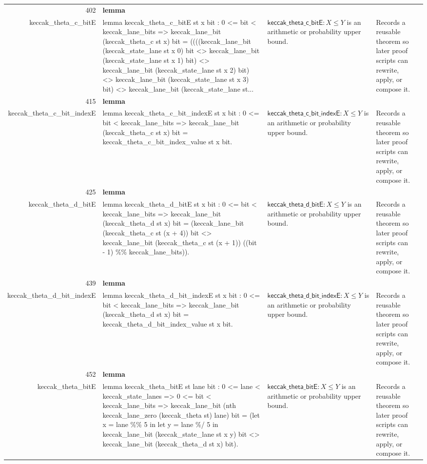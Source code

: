 \documentclass[10pt]{article}
\newcommand{\ec}[1]{\begingroup\ttfamily\scriptsize #1\endgroup}
\begin{document}
\begin{longtable}{r L{0.17\textwidth} L{0.26\textwidth} L{0.27\textwidth} L{0.20\textwidth}}
402 & \textbf{lemma}\\\ec{keccak\_theta\_c\_bitE} & \ec{lemma keccak\_theta\_c\_bitE st x bit : 0 <= bit < keccak\_lane\_bits => keccak\_lane\_bit (keccak\_theta\_c st x) bit = ((((keccak\_lane\_bit (keccak\_state\_lane st x 0) bit <> keccak\_lane\_bit (keccak\_state\_lane st x 1) bit) <> keccak\_lane\_bit (keccak\_state\_lane st x 2) bit) <> keccak\_lane\_bit (keccak\_state\_lane st x 3) bit) <> keccak\_lane\_bit (keccak\_state\_lane st...} & \(\mathsf{keccak\_theta\_c\_bitE} : X \le Y\) is an arithmetic or probability upper bound. & Records a reusable theorem so later proof scripts can rewrite, apply, or compose it. \\
415 & \textbf{lemma}\\\ec{keccak\_theta\_c\_bit\_indexE} & \ec{lemma keccak\_theta\_c\_bit\_indexE st x bit : 0 <= bit < keccak\_lane\_bits => keccak\_lane\_bit (keccak\_theta\_c st x) bit = keccak\_theta\_c\_bit\_index\_value st x bit.} & \(\mathsf{keccak\_theta\_c\_bit\_indexE} : X \le Y\) is an arithmetic or probability upper bound. & Records a reusable theorem so later proof scripts can rewrite, apply, or compose it. \\
425 & \textbf{lemma}\\\ec{keccak\_theta\_d\_bitE} & \ec{lemma keccak\_theta\_d\_bitE st x bit : 0 <= bit < keccak\_lane\_bits => keccak\_lane\_bit (keccak\_theta\_d st x) bit = (keccak\_lane\_bit (keccak\_theta\_c st (x + 4)) bit <> keccak\_lane\_bit (keccak\_theta\_c st (x + 1)) ((bit - 1) \%\% keccak\_lane\_bits)).} & \(\mathsf{keccak\_theta\_d\_bitE} : X \le Y\) is an arithmetic or probability upper bound. & Records a reusable theorem so later proof scripts can rewrite, apply, or compose it. \\
439 & \textbf{lemma}\\\ec{keccak\_theta\_d\_bit\_indexE} & \ec{lemma keccak\_theta\_d\_bit\_indexE st x bit : 0 <= bit < keccak\_lane\_bits => keccak\_lane\_bit (keccak\_theta\_d st x) bit = keccak\_theta\_d\_bit\_index\_value st x bit.} & \(\mathsf{keccak\_theta\_d\_bit\_indexE} : X \le Y\) is an arithmetic or probability upper bound. & Records a reusable theorem so later proof scripts can rewrite, apply, or compose it. \\
452 & \textbf{lemma}\\\ec{keccak\_theta\_bitE} & \ec{lemma keccak\_theta\_bitE st lane bit : 0 <= lane < keccak\_state\_lanes => 0 <= bit < keccak\_lane\_bits => keccak\_lane\_bit (nth keccak\_lane\_zero (keccak\_theta st) lane) bit = (let x = lane \%\% 5 in let y = lane \%/ 5 in keccak\_lane\_bit (keccak\_state\_lane st x y) bit <> keccak\_lane\_bit (keccak\_theta\_d st x) bit).} & \(\mathsf{keccak\_theta\_bitE} : X \le Y\) is an arithmetic or probability upper bound. & Records a reusable theorem so later proof scripts can rewrite, apply, or compose it. \\

\end{longtable}
\end{document}
